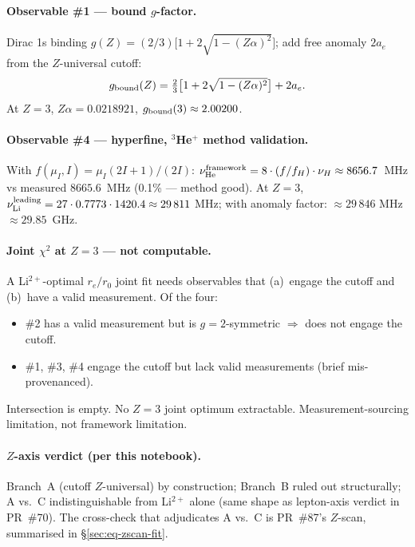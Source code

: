 \paragraph{Observable \#1 --- bound $g$-factor.}
Dirac 1s binding $g(Z) = (2/3)\bigl[1 + 2\sqrt{1 - (Z\alpha)^2}\bigr]$;
add free anomaly $2 a_e$ from the $Z$-universal cutoff:
\[
g_{\rm bound}(Z) = \tfrac{2}{3}\bigl[1 + 2\sqrt{1 - (Z\alpha)^2}\bigr] + 2 a_e.
\]
At $Z=3$, $Z\alpha = 0.0218921$, $g_{\rm bound}(3) \approx 2.00200$.

\paragraph{Observable \#4 --- hyperfine, $^3$He$^+$ method validation.}
With $f(\mu_I, I) = \mu_I (2I+1)/(2I)$:
$\nu_{\rm He}^{\rm framework} = 8 \cdot (f/f_H) \cdot \nu_H \approx 8656.7$~MHz
vs measured $8665.6$~MHz (0.1\% --- method good).
At $Z=3$, $\nu_{\rm Li}^{\rm leading} = 27 \cdot 0.7773 \cdot 1420.4 \approx
29\,811$ MHz; with anomaly factor: $\approx 29\,846$ MHz $\approx 29.85$~GHz.

\paragraph{Joint $\chi^2$ at $Z=3$ --- not computable.}
A Li$^{2+}$-optimal $r_e/r_0$ joint fit needs observables that (a)~engage the
cutoff and (b)~have a valid measurement.
Of the four:
\begin{itemize}[topsep=2pt,itemsep=0pt]
  \item \#2 has a valid measurement but is $g{=}2$-symmetric $\Rightarrow$ does
        not engage the cutoff.
  \item \#1, \#3, \#4 engage the cutoff but lack valid measurements
        (brief mis-provenanced).
\end{itemize}
Intersection is empty. No $Z=3$ joint optimum extractable. Measurement-sourcing
limitation, not framework limitation.

\paragraph{$Z$-axis verdict (per this notebook).}
Branch~A (cutoff $Z$-universal) by construction; Branch~B ruled out
structurally; A vs.~C indistinguishable from Li$^{2+}$ alone (same shape as
lepton-axis verdict in PR~\#70). The cross-check that adjudicates A vs.~C is
PR~\#87's $Z$-scan, summarised in \S\ref{sec:eq-zscan-fit}.

